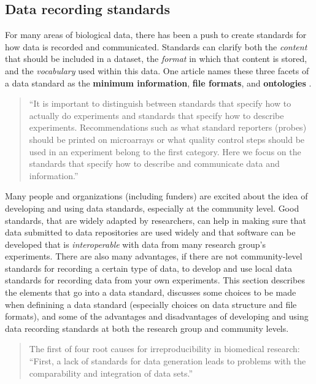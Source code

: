 \documentclass[]{tufte-book}
\begin{document}
\hypertarget{data-recording-standards}{%
\subsection{Data recording standards}\label{data-recording-standards}}

For many areas of biological data, there has been a push to create standards for
how data is recorded and communicated. Standards can clarify both the \emph{content}
that should be included in a dataset, the \emph{format} in which that content is
stored, and the \emph{vocabulary} used within this data. One article names these three
facets of a data standard as the \textbf{minimum information}, \textbf{file formats}, and
\textbf{ontologies} \citep{ghosh2011software}.

\begin{quote}
``It is important to distinguish between standards that specify how to actually
do experiments and standards that specify how to describe experiments.
Recommendations such as what standard reporters (probes) should be printed on
microarrays or what quality control steps should be used in an experiment belong
to the first category. Here we focus on the standards that specify how to
describe and communicate data and information.'' \citep{brazma2006standards}
\end{quote}

Many people and organizations (including funders) are excited about the idea
of developing and using data standards, especially at the community level.
Good standards, that are widely adapted by researchers, can help in making
sure that data submitted to data repositories are used widely and that software
can be developed that is \emph{interoperable} with data from many research group's
experiments. There are also many advantages, if there are not community-level
standards for recording a certain type of data, to develop and use local
data standards for recording data from your own experiments. This section
describes the elements that go into a data standard, discusses some choices
to be made when definining a data standard (especially choices on data
structure and file formats), and some of the advantages and disadvantages
of developing and using data recording standards at both the research group
and community levels.

\begin{quote}
The first of four root causes for irreproducibility in biomedical research: ``First,
a lack of standards for data generation leads to problems with the comparability
and integration of data sets.'' \citep{waltemath2016modeling}
\end{quote}
\end{document}
